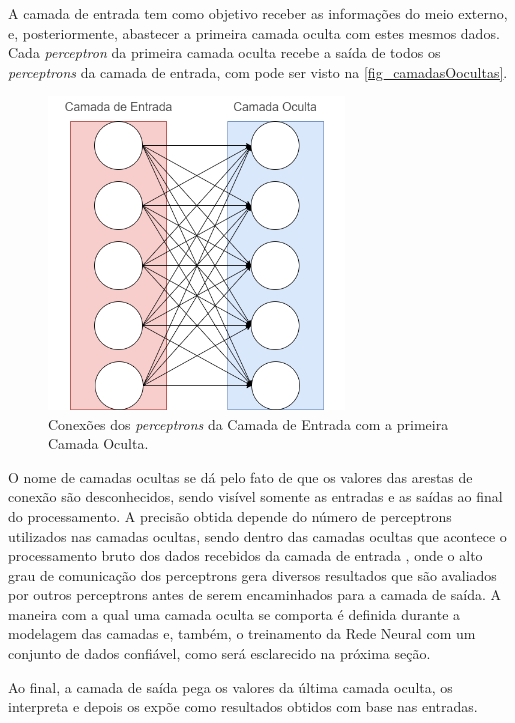 A camada de entrada tem como objetivo receber as informações do meio 
externo, e, posteriormente, abastecer a primeira camada oculta com estes mesmos 
dados. Cada \textit{perceptron} da primeira camada oculta recebe a saída de todos os 
\textit{perceptrons} da camada de entrada, com pode ser visto na \autoref{fig_camadasOocultas}.

\begin{figure}[htb]
        \centering
        \caption{\label{fig_camadasOocultas}Conex{\~o}es dos \textit{perceptrons} da Camada de Entrada com a primeira Camada Oculta.}
        \includegraphics[width=0.7\textwidth]{images/CamadasOcultas.png}
\end{figure}

O nome de camadas ocultas se dá pelo fato de que os valores das arestas de 
conexão são desconhecidos, sendo visível somente as entradas e as saídas ao final 
do processamento. A precisão obtida depende do número de perceptrons utilizados 
nas camadas ocultas, sendo dentro das camadas ocultas que acontece o 
processamento bruto dos dados recebidos da camada de entrada \cite{liu2008uso}, 
onde o alto grau de comunicação dos perceptrons gera diversos resultados 
que são avaliados por outros perceptrons antes de serem encaminhados para a 
camada de saída. A maneira com a qual uma camada oculta se comporta é definida 
durante a modelagem das camadas e, também, o treinamento da Rede Neural com 
um conjunto de dados confiável, como será esclarecido na próxima seção.

Ao final, a camada de saída pega os valores da última camada oculta, os 
interpreta e depois os expõe como resultados obtidos com base nas entradas.

